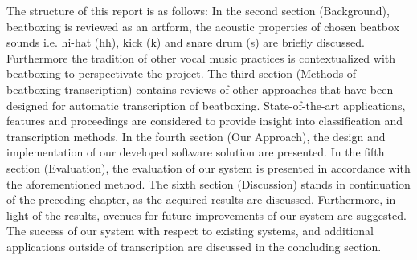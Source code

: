 The structure of this report is as follows: In the second section (Background), beatboxing is reviewed as an artform, the acoustic properties of chosen beatbox sounds i.e. hi-hat (hh), kick (k) and snare drum (s) are briefly discussed. Furthermore the tradition of other vocal music practices is contextualized with beatboxing to perspectivate the project. The third section (Methods of beatboxing-transcription) contains reviews of other approaches that have been designed for automatic transcription of beatboxing. State-of-the-art applications, features and proceedings are considered to provide insight into classification and transcription methods. In the fourth section (Our Approach), the design and implementation of our developed software solution are presented. In the fifth section (Evaluation), the evaluation of our system is presented in accordance with the aforementioned method. The sixth section (Discussion) stands in continuation of the preceding chapter, as the acquired results are discussed. Furthermore, in light of the results, avenues for future improvements of our system are suggested. The success of our system with respect to existing systems, and additional applications outside of transcription are discussed in the concluding section.